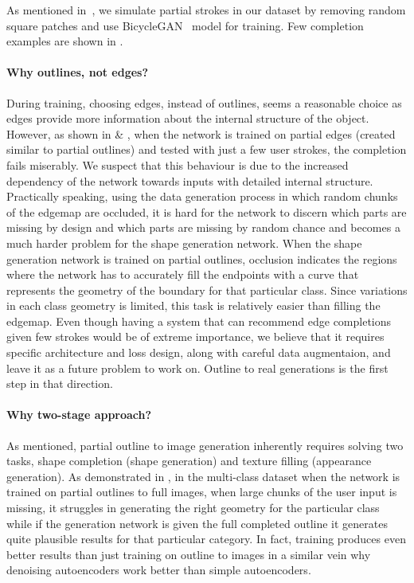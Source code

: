 As mentioned in~, we simulate partial strokes in our dataset by removing random square patches and use BicycleGAN~\cite{zhu2017toward} model for training. Few completion examples are shown in .

\paragraph{Why outlines, not edges?} During training, choosing edges, instead of outlines, seems a reasonable choice as edges provide more information about the internal structure of the object. However, as shown in  \& , when the network is trained on partial edges (created similar to partial outlines) and tested with just a few user strokes, the completion fails miserably. We suspect that this behaviour is due to the increased dependency of the network towards inputs with detailed internal structure. Practically speaking, using the data generation process in which random chunks of the edgemap are occluded, it is hard for the network to discern which parts are missing by design and which parts are missing by random chance and becomes a much harder problem for the shape generation network. When the shape generation network is trained on partial outlines, occlusion indicates the regions where the network has to accurately fill the endpoints with a curve that represents the geometry of the boundary for that particular class. Since variations in each class geometry is limited, this task is relatively easier than filling the edgemap. Even though having a system that can recommend edge completions given few strokes would be of extreme importance, we believe that it requires specific architecture and loss design, along with careful data augmentaion, and leave it as a future problem to work on. Outline to real generations is the first step in that direction.

\paragraph{Why two-stage approach?} As mentioned, partial outline to image generation inherently requires solving two tasks, shape completion (shape generation) and texture filling (appearance generation). As demonstrated in , in the multi-class dataset when the network is trained on partial outlines to full images, when large chunks of the user input is missing, it struggles in generating the right geometry for the particular class while if the generation network is given the full completed outline it generates quite plausible results for that particular category. 
In fact, training produces even better results than just training on outline to images in a similar vein why denoising autoencoders \cite{vincent2010stacked} work better than simple autoencoders.

